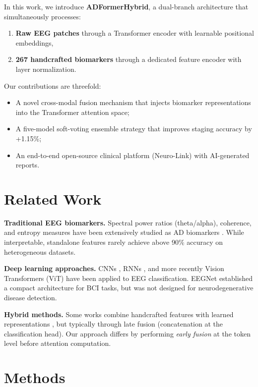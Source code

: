 \documentclass[twocolumn,11pt]{article}
\begin{document}
In this work, we introduce \textbf{ADFormerHybrid}, a dual-branch architecture that simultaneously processes:
\begin{enumerate}[nosep]
  \item \textbf{Raw EEG patches} through a Transformer encoder with learnable positional embeddings,
  \item \textbf{267 handcrafted biomarkers} through a dedicated feature encoder with layer normalization.
\end{enumerate}

Our contributions are threefold:
\begin{itemize}[nosep]
  \item A novel cross-modal fusion mechanism that injects biomarker representations into the Transformer attention space;
  \item A five-model soft-voting ensemble strategy that improves staging accuracy by +1.15\%;
  \item An end-to-end open-source clinical platform (Neuro-Link) with AI-generated reports.
\end{itemize}

\section{Related Work}

\textbf{Traditional EEG biomarkers.}
Spectral power ratios (theta/alpha), coherence, and entropy measures have been extensively studied as AD biomarkers \cite{dauwels2010, jeong2004}. While interpretable, standalone features rarely achieve above 90\% accuracy on heterogeneous datasets.

\textbf{Deep learning approaches.}
CNNs \cite{ieracitano2020}, RNNs \cite{morabito2017}, and more recently Vision Transformers (ViT) \cite{dosovitskiy2020} have been applied to EEG classification. EEGNet \cite{lawhern2018} established a compact architecture for BCI tasks, but was not designed for neurodegenerative disease detection.

\textbf{Hybrid methods.}
Some works combine handcrafted features with learned representations \cite{li2022}, but typically through late fusion (concatenation at the classification head). Our approach differs by performing \textit{early fusion} at the token level before attention computation.

\section{Methods}
\end{document}
